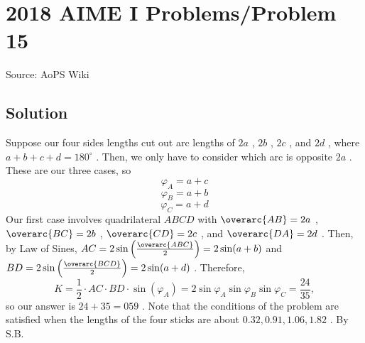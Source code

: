 \documentclass[12pt]{article}
\begin{document}
\section*{{2018 AIME I Problems/Problem 15}}
Source: AoPS Wiki

\subsection*{Solution}
Suppose our four sides lengths cut out arc lengths of $2a$ , $2b$ , $2c$ , and $2d$ , where $a+b+c+d=180^\circ$ . Then, we only have to consider which arc is opposite $2a$ . These are our three cases, so \[\varphi_A=a+c\] \[\varphi_B=a+b\] \[\varphi_C=a+d\] Our first case involves quadrilateral $ABCD$ with $\overarc{AB}=2a$ , $\overarc{BC}=2b$ , $\overarc{CD}=2c$ , and $\overarc{DA}=2d$ . Then, by Law of Sines, $AC=2\sin\left(\frac{\overarc{ABC}}{2}\right)=2\sin(a+b)$ and $BD=2\sin\left(\frac{\overarc{BCD}}{2}\right)=2\sin(a+d)$ . Therefore, \[K=\frac{1}{2}\cdot AC\cdot BD\cdot \sin(\varphi_A)=2\sin\varphi_A\sin\varphi_B\sin\varphi_C=\frac{24}{35},\] so our answer is $24+35=\boxed{059}$ . Note that the conditions of the problem are satisfied when the lengths of the four sticks are about $0.32, 0.91, 1.06, 1.82$ . By S.B.
\end{document}

